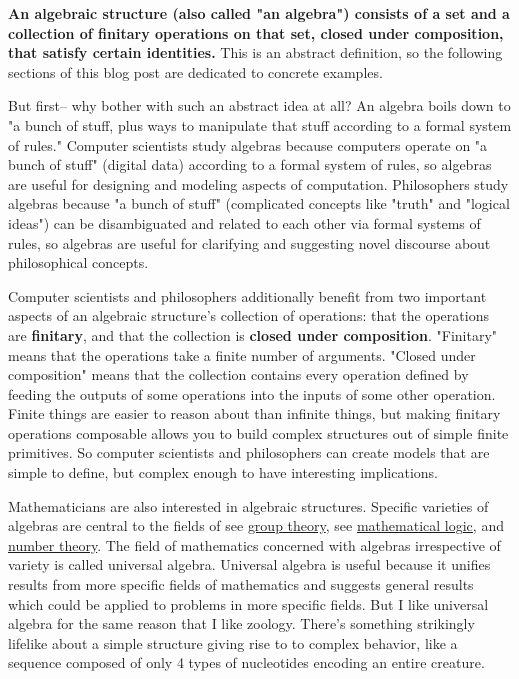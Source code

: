 \documentclass{article}
\begin{document}
\textbf{An algebraic structure (also called "an algebra") consists of a set and a collection of finitary operations on that set, closed under composition, that satisfy certain identities.} This is an abstract definition, so the following sections of this blog post are dedicated to concrete examples.

But first-- why bother with such an abstract idea at all? An algebra boils down to "a bunch of stuff, plus ways to manipulate that stuff according to a formal system of rules." Computer scientists study algebras because computers operate on "a bunch of stuff" (digital data) according to a formal system of rules, so algebras are useful for designing and modeling aspects of computation. Philosophers study algebras because "a bunch of stuff" (complicated concepts like "truth" and "logical ideas") can be disambiguated and related to each other via formal systems of rules, so algebras are useful for clarifying and suggesting novel discourse about philosophical concepts.

Computer scientists and philosophers additionally benefit from two important aspects of an algebraic structure's collection of operations: that the operations are \textbf{finitary}, and that the collection is \textbf{closed under composition}. "Finitary" means that the operations take a finite number of arguments. "Closed under composition" means that the collection contains every operation defined by feeding the outputs of some operations into the inputs of some other operation. Finite things are easier to reason about than infinite things, but making finitary operations composable allows you to build complex structures out of simple finite primitives. So computer scientists and philosophers can create models that are simple to define, but complex enough to have interesting implications.

Mathematicians are also interested in algebraic structures. Specific varieties of algebras are central to the fields of see \href{https://mathworld.wolfram.com/GroupTheory.html}{group theory}, see \href{https://mathworld.wolfram.com/Logic.html}{mathematical logic}, and \href{https://mathworld.wolfram.com/NumberTheory.html}{number theory}. The field of mathematics concerned with algebras irrespective of variety is called universal algebra. Universal algebra is useful because it unifies results from more specific fields of mathematics and suggests general results which could be applied to problems in more specific fields. But I like universal algebra for the same reason that I like zoology. There's something strikingly lifelike about a simple structure giving rise to to complex behavior, like a sequence composed of only 4 types of nucleotides encoding an entire creature.
\end{document}
